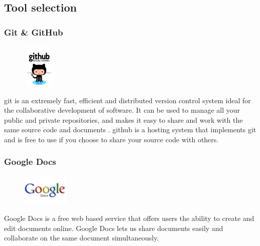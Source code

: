 \subsection{Tool selection}
\subsubsection{Git \& GitHub}
\begin{figure}
  \vspace{-40pt}
  \begin{center}
    \includegraphics[width=60px,height=80px]{GitHub}
  \end{center}

\end{figure}
\gls{git} is an extremely fast, efficient and distributed version control system ideal for the collaborative development of software. It can be used to manage all your public and private repositories, and makes it easy to share and work with the same source code and documents \cite{bib:git}. \gls{github} is a hosting system that implements git and is free to use if you choose to share your source code with others. 

\subsubsection{Google Docs}
\begin{figure}
  \vspace{-45pt}
  \begin{center}
    \includegraphics[width=0.2\textwidth]{GoogleDocs}
  \end{center}

\end{figure}
Google Docs is a free web based service that offers users the ability to create and edit documents online. Google Docs lets us share documents easily and collaborate on the same document simultaneously.	

